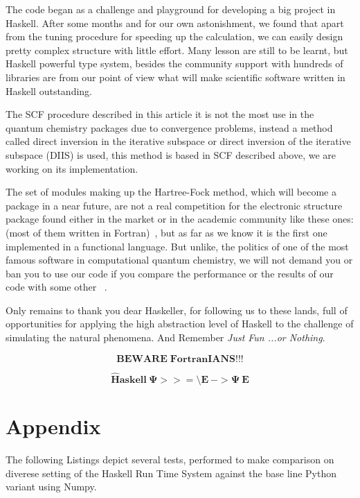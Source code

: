 \documentclass{tmr}
\begin{document}
The code began as a challenge and playground for developing a big project 
in Haskell. After some months and for our own astonishment, we found that
apart from the tuning procedure for speeding up the calculation, we can
easily design pretty complex structure with little effort. Many lesson 
are still to be learnt, but Haskell powerful type system, besides the 
community support with hundreds of libraries are from our point of view what will make 
scientific software written in Haskell outstanding.

The SCF procedure described in this article it is not the most use in
the quantum chemistry packages due to convergence problems, instead a
 method called direct inversion in the iterative subspace or direct
inversion of the iterative subspace (DIIS) is used, this method is 
based in SCF described above, we are working on its implementation.

The set of modules making up the Hartree-Fock method, which will 
become a package in a near future, are not a real competition
for the electronic structure package found either in the market
or in the academic community like these ones: (most of them
written in Fortran)~\cite{software},
but as far as we know it is the first one implemented in a 
functional language. But unlike, the politics of one of the 
most famous software in computational quantum chemistry, we
will not demand you or ban you to use our code if you
compare the performance or the results of our code with some
other ~\cite{banned}. 

Only remains to thank you dear Haskeller, for following us to these 
lands, full of opportunities for applying the high abstraction level
of Haskell to the challenge of simulating the natural phenomena. And
Remember \textit{Just Fun ...or Nothing}. 

\[\mathbf{BEWARE\;FortranIANS!!!} \]


\[\mathbf{\hat{H}askell\: \Psi >>= \setminus E\: -> \Psi\: E }\]

\section{Appendix}

The following Listings depict several tests, performed to make comparison on diverese setting of the Haskell Run Time System 
against the base line Python variant using Numpy.
\end{document}
